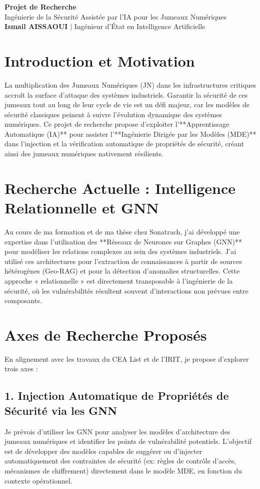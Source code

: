 \documentclass[11pt,a4paper]{article}
\begin{document}
\begin{center}
    {\LARGE\bfseries\color{titleblue} Projet de Recherche}\\[6pt]
    {\large Ingénierie de la Sécurité Assistée par l'IA pour les Jumeaux Numériques}\\[4pt]
    \textbf{Ismail AISSAOUI} $|$ Ingénieur d'État en Intelligence Artificielle
\end{center}

\bigskip

\section{Introduction et Motivation}
La multiplication des Jumeaux Numériques (JN) dans les infrastructures critiques accroît la surface d'attaque des systèmes industriels. Garantir la sécurité de ces jumeaux tout au long de leur cycle de vie est un défi majeur, car les modèles de sécurité classiques peinent à suivre l'évolution dynamique des systèmes numériques. Ce projet de recherche propose d'exploiter l'**Apprentissage Automatique (IA)** pour assister l'**Ingénierie Dirigée par les Modèles (MDE)** dans l'injection et la vérification automatique de propriétés de sécurité, créant ainsi des jumeaux numériques nativement résilients.

\section{Recherche Actuelle : Intelligence Relationnelle et GNN}
Au cours de ma formation et de ma thèse chez Sonatrach, j'ai développé une expertise dans l'utilisation des **Réseaux de Neurones sur Graphes (GNN)** pour modéliser les relations complexes au sein des systèmes industriels. J'ai utilisé ces architectures pour l'extraction de connaissances à partir de sources hétérogènes (Geo-RAG) et pour la détection d'anomalies structurelles. Cette approche « relationnelle » est directement transposable à l'ingénierie de la sécurité, où les vulnérabilités résultent souvent d'interactions non prévues entre composants.

\section{Axes de Recherche Proposés}
En alignement avec les travaux du CEA List et de l'IRIT, je propose d'explorer trois axes :

\subsection{1. Injection Automatique de Propriétés de Sécurité via les GNN}
Je prévois d'utiliser les GNN pour analyser les modèles d'architecture des jumeaux numériques et identifier les points de vulnérabilité potentiels. L'objectif est de développer des modèles capables de suggérer ou d'injecter automatiquement des contraintes de sécurité (ex: règles de contrôle d'accès, mécanismes de chiffrement) directement dans le modèle MDE, en fonction du contexte opérationnel.
\end{document}
